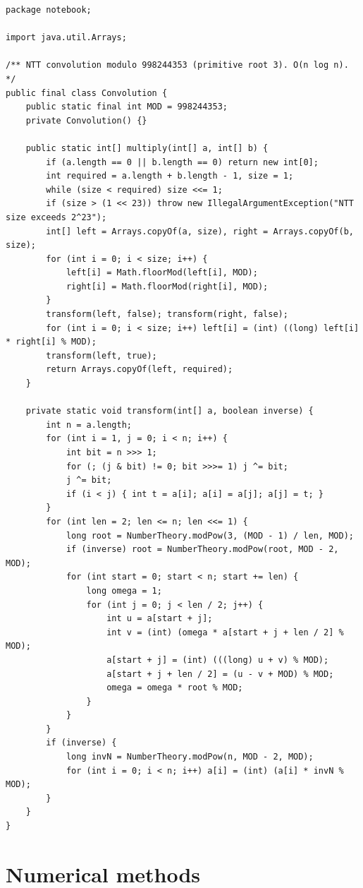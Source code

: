 \documentclass[10pt,letterpaper]{article}
\begin{document}
\begin{lstlisting}
package notebook;

import java.util.Arrays;

/** NTT convolution modulo 998244353 (primitive root 3). O(n log n). */
public final class Convolution {
    public static final int MOD = 998244353;
    private Convolution() {}

    public static int[] multiply(int[] a, int[] b) {
        if (a.length == 0 || b.length == 0) return new int[0];
        int required = a.length + b.length - 1, size = 1;
        while (size < required) size <<= 1;
        if (size > (1 << 23)) throw new IllegalArgumentException("NTT size exceeds 2^23");
        int[] left = Arrays.copyOf(a, size), right = Arrays.copyOf(b, size);
        for (int i = 0; i < size; i++) {
            left[i] = Math.floorMod(left[i], MOD);
            right[i] = Math.floorMod(right[i], MOD);
        }
        transform(left, false); transform(right, false);
        for (int i = 0; i < size; i++) left[i] = (int) ((long) left[i] * right[i] % MOD);
        transform(left, true);
        return Arrays.copyOf(left, required);
    }

    private static void transform(int[] a, boolean inverse) {
        int n = a.length;
        for (int i = 1, j = 0; i < n; i++) {
            int bit = n >>> 1;
            for (; (j & bit) != 0; bit >>>= 1) j ^= bit;
            j ^= bit;
            if (i < j) { int t = a[i]; a[i] = a[j]; a[j] = t; }
        }
        for (int len = 2; len <= n; len <<= 1) {
            long root = NumberTheory.modPow(3, (MOD - 1) / len, MOD);
            if (inverse) root = NumberTheory.modPow(root, MOD - 2, MOD);
            for (int start = 0; start < n; start += len) {
                long omega = 1;
                for (int j = 0; j < len / 2; j++) {
                    int u = a[start + j];
                    int v = (int) (omega * a[start + j + len / 2] % MOD);
                    a[start + j] = (int) (((long) u + v) % MOD);
                    a[start + j + len / 2] = (u - v + MOD) % MOD;
                    omega = omega * root % MOD;
                }
            }
        }
        if (inverse) {
            long invN = NumberTheory.modPow(n, MOD - 2, MOD);
            for (int i = 0; i < n; i++) a[i] = (int) (a[i] * invN % MOD);
        }
    }
}
\end{lstlisting}
\section{Numerical methods}
\end{document}
